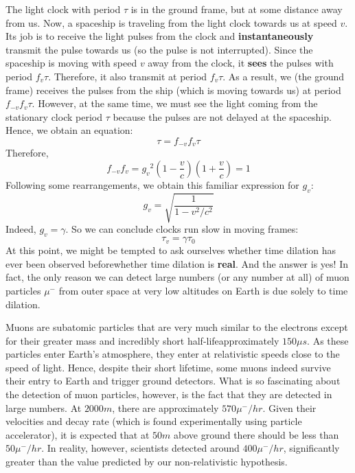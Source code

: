 \documentclass[a4paper,11pt]{article}
\numberwithin{equation}{section}
\begin{document}
 \noindent The light clock with period $\tau$ is in the ground frame, but at some distance away from us. Now, a spaceship is traveling from the light clock towards us at speed $v$. Its job is to receive the light pulses from the clock and \textbf{instantaneously} transmit the pulse towards us (so the pulse is not interrupted). Since the spaceship is moving with speed $v$ away from the clock, it \textbf{sees} the pulses with period $f_{v}\tau$. Therefore, it also transmit at period $f_{v}\tau$. As a result, we (the ground frame) receives the pulses from the ship (which is moving towards us) at period $f_{-v}f_{v}\tau$. However, at the same time, we must see the light coming from the stationary clock period $\tau$ because the pulses are not delayed at the spaceship. Hence, we obtain an equation:
 \begin{equation}\label{eq:4.27}
 \tau=f_{-v}f_{v}\tau
 \end{equation}
 Therefore,
 \begin{equation}\label{eq:4.28}
 f_{-v}f_{v}={g_{v}}^{2}\left(1-\frac{v}{c}\right)\left(1+\frac{v}{c}\right)=1
 \end{equation}
 Following some rearrangements, we obtain this familiar expression for $g_{v}$:
 \begin{equation}\label{eq:4.29}
 g_{v}=\sqrt{\frac{1}{1-v^2/c^2}}
 \end{equation}
 Indeed, $g_{v}=\gamma$. So we can conclude clocks run slow in moving frames:
 \begin{equation}\label{eq:4.30}
 \tau_{v}=\gamma\tau_{0}
 \end{equation}
 \noindent At this point, we might be tempted to ask ourselves whether time dilation has ever been observed before\textemdash whether time dilation is \textbf{real}. And the answer is yes! In fact, the only reason we can detect large numbers (or any number at all) of muon particles $\mu^{-}$ from outer space at very low altitudes on Earth is due solely to time dilation. 
 
 \noindent Muons are subatomic particles that are very much similar to the electrons except for their greater mass and incredibly short half-life\textemdash approximately $150\mu s$. As these particles enter Earth's atmosphere, they enter at relativistic speeds close to the speed of light. Hence, despite their short lifetime, some muons indeed survive their entry to Earth and trigger ground detectors. What is so fascinating about the detection of muon particles, however, is the fact that they are detected in large numbers. At $2000m$, there are approximately $570{\mu}^{-}/hr$. Given their velocities and decay rate (which is found experimentally using particle accelerator), it is expected that at $50m$ above ground there should be less than $50{\mu}^{-}/hr$. In reality, however, scientists detected around $400{\mu}^{-}/hr$, significantly greater than the value predicted by our non-relativistic hypothesis.  
 
\end{document}
